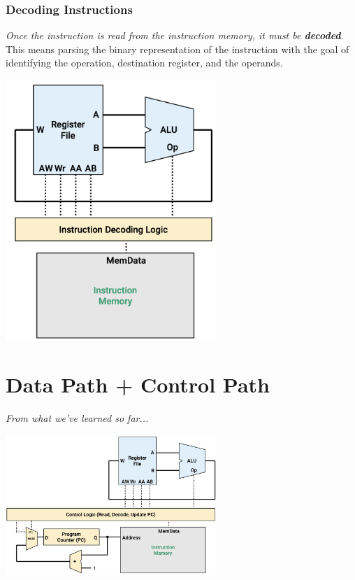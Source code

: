 \documentclass[12pt,openany]{book}
\begin{document}
\subsubsection{Decoding Instructions}

\begin{minipage}[htp]{0.45\textwidth}

\begin{justify}
		\textit{Once the instruction is read from the instruction memory, it must be \textbf{decoded}}.\\
		 This means parsing the binary representation of the instruction with the goal of identifying the operation, destination register, and the operands.
	
\end{justify}\end{minipage}
\hfill
\vline
\hfill
\begin{minipage}[htp]{0.45\textwidth}
	\begin{center}
		\includegraphics[width=0.6\textwidth]{circuits/19.4.2_5.png}
	\end{center}
\end{minipage}
\section{Data Path + Control Path}
\textit{From what we've learned so far...}\newline
{}
\begin{center}
\includegraphics[width=0.6\textwidth]{circuits/19.5.png}
\end{center}
\end{document}
